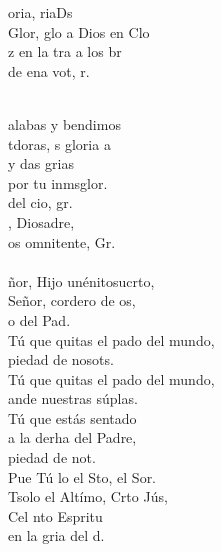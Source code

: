 \begin{cancion}%
	\begin{chorus}%
	oria, riaDs\\
	Glor, glo a Dios en Clo\\
	z en la tra a los br\\
	de ena vot, r. \\
	\end{chorus}%
	\jump\\
	alabas y  bendimos\\
	tdoras, s gloria a \\
	y das grias \\
	por tu inmsglor.\\
	 del cio, gr.\\
	, Diosadre, \\
	os omnitente, Gr.  \\
\jump\\
	ñor, Hijo unénitosucrto,\\
	Señor, cordero de os, \\
	o del Pad.\\
	Tú que quitas el pado del mundo,\\
	 piedad de nosots.\\
	Tú que quitas el pado del mundo,\\
	ande nuestras súplas.\\
Tú que estás sentado \\
	a la derha del Padre,\\
	 piedad de not. \\
	Pue Tú lo el Sto, el Sor. \\
	Tsolo el Altímo, Crto Jús,\\
	Cel nto Espritu\\
	en la gria del d.  \\
\end{cancion}%
